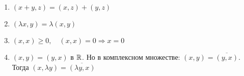 \documentclass[12pt]{article}
\begin{document}
    \begin{enumerate}
        \item $(x + y, z) = (x, z) + (y, z)$

        \item $(\lambda x, y) = \lambda (x, y)$

        \item $(x, x) \geq 0, \quad (x, x) = 0 \Longrightarrow x = 0$

        \item $(x, y) = (y, x)$ в $\mathbb{R}$. Но в комплексном множестве: $(x, y) = \overline{(y, x)}$. Тогда $(x, \lambda y) = \overline{(\lambda y, x)}$
    \end{enumerate}
\end{document}

